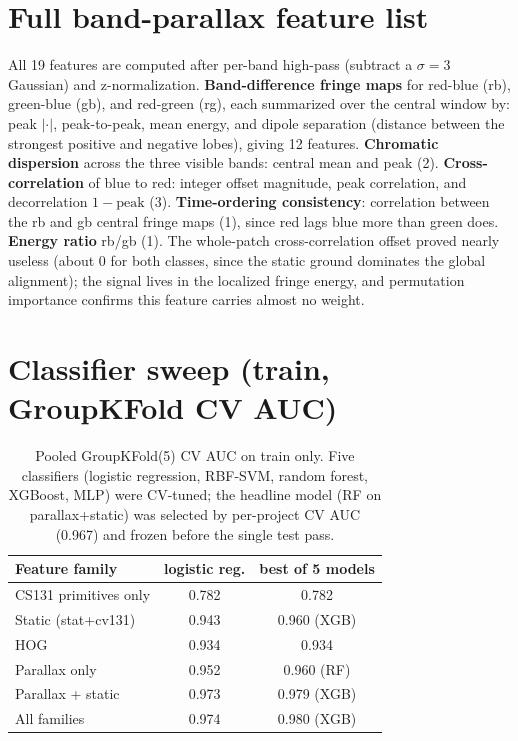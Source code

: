\documentclass[10pt,twocolumn,letterpaper]{article}
\begin{document}
\section{Full band-parallax feature list}
\label{app:features}
All 19 features are computed after per-band high-pass (subtract a $\sigma{=}3$ Gaussian) and z-normalization. \textbf{Band-difference fringe maps} for red-blue (rb), green-blue (gb), and red-green (rg), each summarized over the central window by: peak $|\cdot|$, peak-to-peak, mean energy, and dipole separation (distance between the strongest positive and negative lobes), giving 12 features. \textbf{Chromatic dispersion} across the three visible bands: central mean and peak (2). \textbf{Cross-correlation} of blue to red: integer offset magnitude, peak correlation, and decorrelation $1{-}\text{peak}$ (3). \textbf{Time-ordering consistency}: correlation between the rb and gb central fringe maps (1), since red lags blue more than green does. \textbf{Energy ratio} rb/gb (1). The whole-patch cross-correlation offset proved nearly useless (about 0 for both classes, since the static ground dominates the global alignment); the signal lives in the localized fringe energy, and permutation importance confirms this feature carries almost no weight.

\section{Classifier sweep (train, GroupKFold CV AUC)}
\label{app:sweep}
\begin{table}[h]
\centering
\small
\begin{tabular}{lcc}
\toprule
Feature family & logistic reg. & best of 5 models \\
\midrule
CS131 primitives only & 0.782 & 0.782 \\
Static (stat+cv131) & 0.943 & 0.960 (XGB) \\
HOG & 0.934 & 0.934 \\
Parallax only & 0.952 & 0.960 (RF) \\
Parallax + static & 0.973 & 0.979 (XGB) \\
All families & 0.974 & 0.980 (XGB) \\
\bottomrule
\end{tabular}
\caption{Pooled GroupKFold(5) CV AUC on train only. Five classifiers (logistic regression, RBF-SVM, random forest, XGBoost, MLP) were CV-tuned; the headline model (RF on parallax+static) was selected by per-project CV AUC (0.967) and frozen before the single test pass.}
\end{table}
\end{document}

